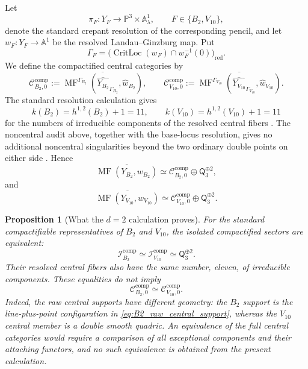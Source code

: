 \documentclass[11pt]{amsart}
\newtheorem{proposition}[theorem]{Proposition}
\theoremstyle{definition}
\theoremstyle{remark}
\DeclareMathOperator{\MF}{MF}
\DeclareMathOperator{\CritLoc}{CritLoc}
\newcommand{\MorseCat}[1]{\mathsf{Q}_{#1}}
\newcommand{\CcompBtwo}{\mathcal C^{\mathrm{comp}}_{B_2,0}}
\newcommand{\CcompVten}{\mathcal C^{\mathrm{comp}}_{V_{10},0}}
\begin{document}
Let
\[
\pi_F:Y_F\longrightarrow
\mathbb P^3\times\mathbb A^1_\lambda,
\qquad F\in\{B_2,V_{10}\},
\]
denote the standard crepant resolution of the corresponding pencil, and let
$w_F:Y_F\to\mathbb A^1$ be the resolved Landau--Ginzburg map.  Put
\[
\Gamma_F
=
\bigl(\CritLoc(w_F)\cap w_F^{-1}(0)\bigr)_{\mathrm{red}}.
\]
We define the compactified central categories by
\begin{equation}
\label{eq:d2_compact_central_categories}
\CcompBtwo
:=
\overline{\MF^{\Gamma_{B_2}}
(\widehat{Y_{B_2}}_{\Gamma_{B_2}},\widehat w_{B_2})},
\qquad
\CcompVten
:=
\overline{\MF^{\Gamma_{V_{10}}}
(\widehat{Y_{V_{10}}}_{\Gamma_{V_{10}}},\widehat w_{V_{10}})}.
\end{equation}
The standard resolution calculation gives
\begin{equation}
\label{eq:d2_component_count}
k(B_2)=h^{1,2}(B_2)+1=11,
\qquad
k(V_{10})=h^{1,2}(V_{10})+1=11
\end{equation}
for the numbers of irreducible components of the resolved central fibers
\cite{PrzyjalkowskiHodge}.  The noncentral audit above, together with the
base-locus resolution, gives no additional noncentral singularities beyond
the two ordinary double points on either side
\cite{Przyjalkowski2026}.  Hence
\begin{equation}
\label{eq:B2_compact_final_decomposition}
\overline{\MF(Y_{B_2},w_{B_2})}
\simeq
\CcompBtwo\oplus\MorseCat{3}^{\oplus2},
\end{equation}
and
\begin{equation}
\label{eq:V10_compact_final_decomposition}
\overline{\MF(Y_{V_{10}},w_{V_{10}})}
\simeq
\CcompVten\oplus\MorseCat{3}^{\oplus2}.
\end{equation}

\begin{proposition}[What the $d=2$ calculation proves]
\label{prop:d2_compactified_comparison}
For the standard compactifiable representatives of $B_2$ and $V_{10}$, the
isolated compactified sectors are equivalent:
\[
\mathcal I_{B_2}^{\mathrm{comp}}
\simeq
\mathcal I_{V_{10}}^{\mathrm{comp}}
\simeq
\MorseCat{3}^{\oplus2}.
\]
Their resolved central fibers also have the same number, eleven, of
irreducible components.  These equalities do not imply
\[
\CcompBtwo\simeq\CcompVten.
\]
Indeed, the raw central supports have different geometry: the $B_2$ support
is the line-plus-point configuration in
\eqref{eq:B2_raw_central_support}, whereas the $V_{10}$ central member is a
double smooth quadric.  An equivalence of the full central categories would
require a comparison of all exceptional components and their attaching
functors, and no such equivalence is obtained from the present calculation.
\end{proposition}
\end{document}
